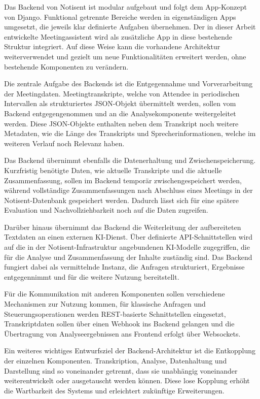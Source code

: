 Das Backend von Notisent ist modular aufgebaut und folgt dem App-Konzept von Django. Funktional getrennte Bereiche werden in eigenständigen Apps umgesetzt, die jeweils klar definierte Aufgaben übernehmen. Der in dieser Arbeit entwickelte Meetingassistent wird als zusätzliche App in diese bestehende Struktur integriert. Auf diese Weise kann die vorhandene Architektur weiterverwendet und gezielt um neue Funktionalitäten erweitert werden, ohne bestehende Komponenten zu verändern.

Die zentrale Aufgabe des Backends ist die Entgegennahme und Vorverarbeitung der Meetingdaten. Meetingtranskripte, welche von Attendee in periodischen Intervallen als strukturiertes JSON-Objekt übermittelt werden, sollen vom Backend entgegengenommen und an die Analysekomponente weitergeleitet werden. Diese JSON-Objekte enthalten neben dem Transkript noch weitere Metadaten, wie die Länge des Transkripts und Sprecherinformationen, welche im weiteren Verlauf noch Relevanz haben. 

Das Backend übernimmt ebenfalls die Datenerhaltung und Zwischenspeicherung. Kurzfristig benötigte Daten, wie aktuelle Transkripte und die aktuelle Zusammenfassung, sollen im Backend temporär zwischengespeichert werden, während vollständige Zusammenfassungen nach Abschluss eines Meetings in der Notisent-Datenbank gespeichert werden. Dadurch lässt sich für eine spätere Evaluation und Nachvollziehbarkeit noch auf die Daten zugreifen.

Darüber hinaus übernimmt das Backend die Weiterleitung der aufbereiteten Textdaten an einen externen KI-Dienst. Über definierte API-Schnittstellen wird auf die in der Notisent-Infrastruktur angebundenen KI-Modelle zugegriffen, die für die Analyse und Zusammenfassung der Inhalte zuständig sind. Das Backend fungiert dabei als vermittelnde Instanz, die Anfragen strukturiert, Ergebnisse entgegennimmt und für die weitere Nutzung bereitstellt.

Für die Kommunikation mit anderen Komponenten sollen verschiedene Mechanismen zur Nutzung kommen, für klassische Anfragen und Steuerungsoperationen werden REST-basierte Schnittstellen eingesetzt, Transkriptdaten sollen über einen Webhook ins Backend gelangen und die Übertragung von Analyseergebnissen ans Frontend erfolgt über Websockets.

Ein weiteres wichtiges Entwurfsziel der Backend-Architektur ist die Entkopplung der einzelnen Komponenten. Transkription, Analyse, Datenhaltung und Darstellung sind so voneinander getrennt, dass sie unabhängig voneinander weiterentwickelt oder ausgetauscht werden können. Diese lose Kopplung erhöht die Wartbarkeit des Systems und erleichtert zukünftige Erweiterungen. 


